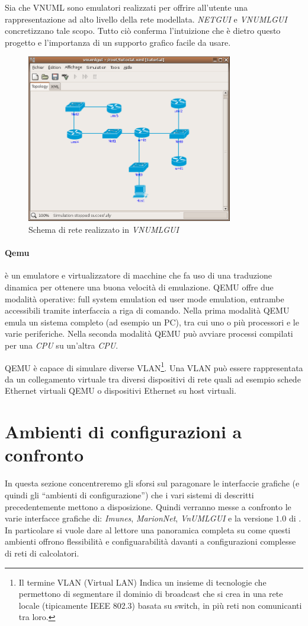 Sia \netkit{} che VNUML sono emulatori realizzati per offrire all'utente una rappresentazione ad alto livello della rete modellata. \emph{NETGUI} e \emph{VNUMLGUI} concretizzano tale scopo. Tutto ciò conferma l'intuizione che è dietro questo progetto e l'importanza di un supporto grafico facile da usare.

\begin{figure}[!ht]
	\centering
	\includegraphics[width=9cm]{images/vnumlgui.png}
	\caption{Schema di rete realizzato in \emph{VNUMLGUI}}
	\label{figura:vnumlgui}
\end{figure}

\paragraph{Qemu}\cite{QUATC05} è un emulatore e virtualizzatore di macchine che fa uso di una traduzione dinamica per ottenere una buona velocità di emulazione. QEMU offre due modalità operative: full system emulation ed user mode emulation, entrambe accessibili tramite interfaccia a riga di comando. Nella prima modalità QEMU emula un sistema completo (ad esempio un PC), tra cui uno o più processori e le varie periferiche. Nella seconda modalità QEMU può avviare processi compilati per una \emph{CPU} su un'altra \emph{CPU}.

QEMU è capace di simulare diverse VLAN\footnote{Il termine VLAN (Virtual LAN) Indica un insieme di tecnologie che permettono di segmentare il dominio di broadcast che si crea in una rete locale (tipicamente IEEE 802.3) basata su switch, in più reti non comunicanti tra loro.}. Una VLAN può essere rappresentata da un collegamento virtuale tra diversi dispositivi di rete quali ad esempio schede Ethernet virtuali QEMU o dispositivi Ethernet su host virtuali.

\section{Ambienti di configurazioni a confronto}
In questa sezione concentreremo gli sforsi sul paragonare le interfaccie grafiche (e quindi gli ``ambienti di configurazione'') che i vari sistemi di \emulazione{} descritti precedentemente mettono a disposizione. Quindi verranno messe a confronto le varie interfacce grafiche di: \emph{Imunes}, \emph{MarionNet}, \emph{VnUMLGUI} e la versione $1.0$ di \visualnetkit{}. In particolare si vuole dare al lettore una panoramica completa su come questi ambienti offrono flessibilità e configuarabilità davanti a configurazioni complesse di reti di calcolatori.

